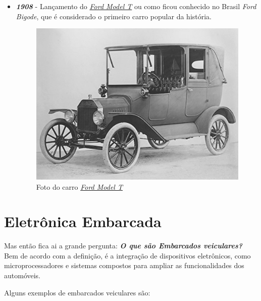 \documentclass[12pt]{article}
\begin{document}
\begin{itemize}
\begin{figure}[htp]
            \end{figure}

            \item \textbf{\emph{1908}} - Lançamento do \href{https://pt.wikipedia.org/wiki/Ford_Model_T}{\emph{Ford Model T}} ou como ficou conhecido no Brasil
            \emph{Ford Bigode}, que é considerado o primeiro carro popular da história.

            \begin{figure}[htp]

                \centering
                \includegraphics[scale=1]{modelt.png}
                \caption{\centering Foto do carro \href{https://pt.wikipedia.org/wiki/Ford_Model_T}{\emph{Ford Model T}}}

            \end{figure}

    \end{itemize}

    \newpage

    \section{Eletrônica Embarcada} \label{sec:embarcado}

    Mas então fica ai a grande pergunta: \textbf{\emph{O que são Embarcados veiculares?}} Bem de acordo com a definição, é a integração de dispositivos eletrônicos, como
    microprocessadores e sistemas compostos para ampliar as funcionalidades dos automóveis.

    Alguns exemplos de embarcados veiculares são:
\end{document}

